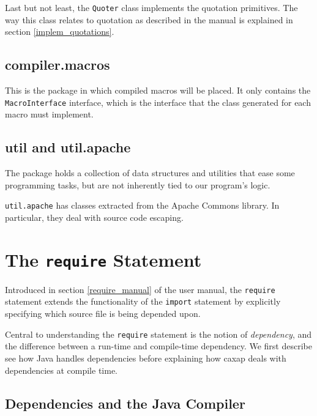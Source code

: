Last but not least, the \texttt{Quoter} class implements the quotation
primitives. The way this class relates to quotation as described in the manual
is explained in section \ref{implem_quotations}.

\subsection{compiler.macros}

This is the package in which compiled macros will be placed. It only contains
the \texttt{MacroInterface} interface, which is the interface that the class
generated for each macro must implement.

\subsection{util and util.apache}

The package holds a collection of data structures and utilities that ease some
programming tasks, but are not inherently tied to our program's logic.

\texttt{util.apache} has classes extracted from the Apache Commons library. In
particular, they deal with source code escaping.

\section{The \texttt{require} Statement}

Introduced in section \ref{require_manual} of the user manual, the
\texttt{require} statement extends the functionality of the \texttt{import}
statement by explicitly specifying which source file is being depended upon.

Central to understanding the \texttt{require} statement is the notion of
\emph{dependency}, and the difference between a run-time and compile-time
dependency. We first describe see how Java handles dependencies before
explaining how caxap deals with dependencies at compile time.

\subsection{Dependencies and the Java Compiler}

